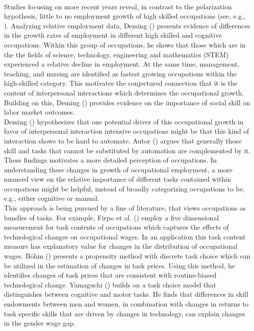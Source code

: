 \documentclass[../main.tex]{subfiles}
\begin{document}
\\
Studies focusing on more recent years reveal, in contrast to the polarization hypothesis, little to no employment growth of high skilled occupations (see, e.g., \cite{beaudry2016great}). Analyzing relative employment data, Deming (\citeyear{deming2017growing}) presents evidence of differences in the growth rates of employment in different high skilled and cognitive occupations. Within this group of occupations, he shows that those which are in the the fields of science, technology, engineering and mathematics (STEM) experienced a relative decline in employment. At the same time, management, teaching, and nursing are identified as fastest growing occupations within the high-skilled category. This motivates the conjectured connection that it is the content of interpersonal interactions which determines the occupational growth. Building on this, Deming (\citeyear{deming2017growing}) provides evidence on the importance of social skill on labor market outcomes.
\\
Deming (\citeyear{deming2017growing}) hypothesizes that one potential driver of this occupational growth in favor of interpersonal interaction intensive occupations might be that this kind of interaction shows to be hard to automate. Autor (\citeyear{autor2015there}) argues that generally those skill and tasks that cannot be substituted by automation are complemented by it. These findings motivates a more detailed perception of occupations. In understanding these changes in growth of occupational employment, a more nuanced view on the relative importance of different tasks contained within occupations might be helpful, instead of broadly categorizing occupations to be, e.g., either cognitive or manual.
\\
This approach is being pursued by a line of literature, that views occupations as bundles of tasks. For example, Firpo et al. (\citeyear{firpo2011occupational}) employ a five dimensional measurement for task contents of occupations which captures the effects of technological changes on occupational wages. In an application this task content measure has explanatory value for changes in the distribution of occupational wages. Böhm (\citeyear{bohm2019price}) presents a propensity method with discrete task choice which can be utilized in the estimation of changes in task prices. Using this method, he identifies changes of task prices that are consistent with routine-biased technological change. Yamaguchi (\citeyear{yamaguchi2018changes}) builds on a task choice model that distinguishes between cognitive and motor tasks. He finds that differences in skill endowments between men and women, in combination with changes in returns to task specific skills that are driven by changes in technology, can explain changes in the gender wage gap.
\end{document}
